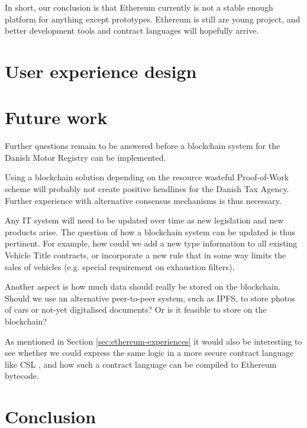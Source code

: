 \documentclass[oneside,a4paper,10pts,article]{memoir}
\begin{document}
In short, our conclusion is that Ethereum currently is not a stable
enough platform for anything except prototypes. Ethereum is still are
young project, and better development tools and contract languages
will hopefully arrive.

\chapter{User experience design}




\chapter{Future work}
\label{sec:futurework}
Further questions remain to be answered before a blockchain system for
the Danish Motor Registry can be implemented.

Using a blockchain solution depending on the resource wasteful
Proof-of-Work scheme will probably not create positive headlines for
the Danish Tax Agency. Further experience with alternative consensus
mechanisms is thus necessary.

Any IT system will need to be updated over time as new legislation and
new products arise. The question of how a blockchain system can be
updated is thus pertinent. For example, how could we add a new type
information to all existing Vehicle Title contracts, or incorporate a
new rule that in some way limits the sales of vehicles (e.g. special
requirement on exhaustion filters).

Another aspect is how much data should really be stored on the
blockchain. Should we use an alternative peer-to-peer system, such as
IPFS, to store photos of cars or not-yet digitalised documents? Or is
it feasible to store on the blockchain?

As mentioned in Section \ref{sec:ethereum-experiences} it would also
be interesting to see whether we could express the same logic in a
more secure contract language like CSL \cite{hvitved2011contract}, and
how such a contract language can be compiled to Ethereum bytecode.

\chapter{Conclusion}
\label{sec:conclusion}






\end{document}
